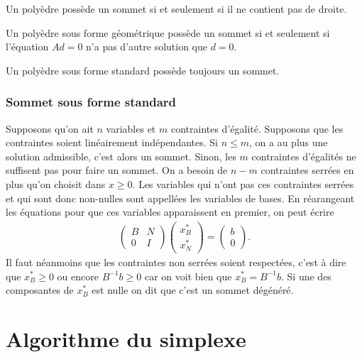 \begin{myprop}
  Un polyèdre possède un sommet si et seulement si il ne contient
  pas de droite.
\end{myprop}

\begin{myprop}
  Un polyèdre sous forme géométrique possède un sommet si et seulement si
  l'équation $Ad = 0$ n'a pas d'autre solution que $d = 0$.
\end{myprop}

\begin{myprop}
  Un polyèdre sous forme standard possède toujours un sommet.
\end{myprop}

\subsubsection{Sommet sous forme standard}
Supposons qu'on ait $n$ variables et $m$ contraintes d'égalité.
Supposons que les contraintes soient linéairement indépendantes.
Si $n \leq m$, on a au plus une solution admissible, c'est alors un sommet.
Sinon, les $m$ contraintes d'égalités ne suffisent pas pour faire un sommet.
On a besoin de $n-m$ contraintes serrées
en plus qu'on choisit dans $x \geq 0$.
Les variables qui n'ont pas ces contraintes serrées et qui sont donc
non-nulles sont appellées les variables de bases.
En réarangeant les équations pour que ces variables apparaissent en premier,
on peut écrire
\begin{align*}
  \begin{pmatrix}
    B & N\\
    0 & I
  \end{pmatrix}
  \begin{pmatrix}
    x_B^*\\
    x_N^*
  \end{pmatrix} =
  \begin{pmatrix}
    b\\
    0
  \end{pmatrix}.
\end{align*}
Il faut néanmoins que les contraintes non serrées soient respectées,
c'est à dire que $x_B^* \geq 0$ ou encore $B^{-1}b \geq 0$ car
on voit bien que $x_B^* = B^{-1}b$.
Si une des composantes de $x_B^*$ est nulle on dit que c'est un
sommet dégénéré.

\section{Algorithme du simplexe}
